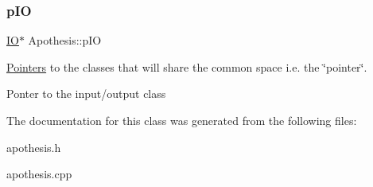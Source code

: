 \subsubsection{\texorpdfstring{p\+IO}{pIO}}
{\footnotesize\ttfamily \mbox{\hyperlink{classIO}{IO}}$\ast$ Apothesis\+::p\+IO}



\mbox{\hyperlink{classPointers}{Pointers}} to the classes that will share the common space i.\+e. the \char`\"{}pointer\char`\"{}. 

Ponter to the input/output class 

The documentation for this class was generated from the following files\+:\begin{DoxyCompactItemize}
\item 
apothesis.\+h\item 
apothesis.\+cpp\end{DoxyCompactItemize}
